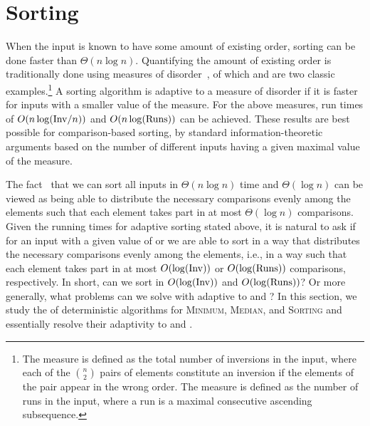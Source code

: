 \section{Sorting}
\label{sec:sorting}

When the input is known to have some amount of existing order, sorting
can be done faster than $\Theta(n \log n)$. Quantifying the amount of
existing order is traditionally done using measures of
disorder~\cite{DBLP:journals/csur/Estivill-CastroW92}, of which \INV{}
and \RUNS{} are two classic examples.\footnote{The measure \INV{} is
  defined as the total number of inversions in the input, where each
  of the ${n\choose 2}$ pairs of elements constitute an inversion if
  the elements of the pair appear in the wrong order. The measure
  \RUNS{} is defined as the number of runs in the input, where a run is a maximal consecutive ascending subsequence.}
%
A sorting algorithm is adaptive to a measure of disorder if it
is faster for inputs with a smaller value of the measure. For the
above measures, run times of $O(n \log (\mathrm{Inv}/n))$ and
$O(n \log (\mathrm{Runs}))$ can be achieved. These results are best possible
for comparison-based sorting, by standard information-theoretic
arguments based on the number of different inputs having a given maximal
value of the measure.

The fact~\cite{aks,afshani:fragile-ESA19} that we can sort all inputs
in $\Theta(n \log n)$ time and $\Theta(\log n)$ \frag can be
viewed as being able to distribute the necessary comparisons evenly
among the elements such that each element takes part in at most
$\Theta(\log n)$ comparisons.
%
Given the running times for adaptive sorting stated above, it is
natural to ask if for an input with a given value of \INV{} or
\RUNS{} we are able to sort in a way that distributes the necessary
comparisons evenly among the elements, i.e., in a way such that each
element takes part in at most $O(\log (\mathrm{Inv}))$ or $O(\log (\mathrm{Runs}))$
comparisons, respectively.
In short, can we sort in \frag $O(\log (\mathrm{Inv}))$ and
$O(\log (\mathrm{Runs}))$?  Or more generally, what problems can we solve with
\frag adaptive to \INV{} and \RUNS{}? In this section, we study
the \frag of deterministic algorithms for \textsc{Minimum},
\textsc{Median}, and \textsc{Sorting} and essentially resolve their
adaptivity to \INV{} and \RUNS{}.

